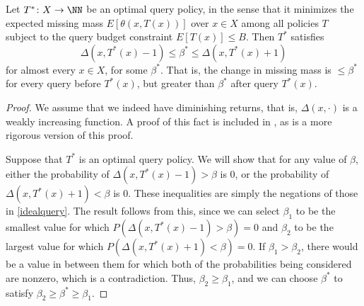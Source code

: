 \documentclass{scrartcl}
\begin{document}
\begin{claim}[note=Query Policy, label=querypolicy]
Let $T^* \colon X \to \NN$ be an optimal query policy, in the sense that it minimizes the expected missing mass $E[\theta(x, T(x))]$
over $x \in X$ among all policies $T$ subject to the query budget constraint $E[T(x)] \le B$. Then $T^*$ satisfies
\begin{equation} \Delta(x, T^*(x) - 1) \le \beta^* \le \Delta(x, T^*(x) + 1) \label{idealquery} \end{equation}
for almost every $x \in X$, for some $\beta^*$.
That is, the change in missing mass is $\le \beta^*$ for every query before $T^*(x)$, but greater than $\beta^*$ after query $T^*(x)$.
\end{claim}
\begin{proof}
We assume that we indeed have diminishing returns, that is, $\Delta(x, \cdot)$ is a weakly increasing function.
A proof of this fact is included in \cite{cpqpaper}, as is a more rigorous version of this proof. \medskip

Suppose that $T^*$ is an optimal query policy. We will show that for any value of $\beta$,
either the probability of $\Delta(x, T^*(x) - 1) > \beta$ is $0$, or the probability of $\Delta(x, T^*(x) + 1) < \beta$ is $0$.
These inequalities are simply the negations of those in \eqref{idealquery}.
The result follows from this, since we can select $\beta_1$ to be the smallest value for which $P(\Delta(x, T^*(x) - 1) > \beta) = 0$
and $\beta_2$ to be the largest value for which $P(\Delta(x, T^*(x) + 1) < \beta) = 0$.
If $\beta_1 > \beta_2$, there would be a value in between them for which both of the probabilities being considered are nonzero,
which is a contradiction. Thus, $\beta_2 \ge \beta_1$, and we can choose $\beta^*$ to satisfy $\beta_2 \ge \beta^* \ge \beta_1$. \medskip


\end{proof}
\end{document}
